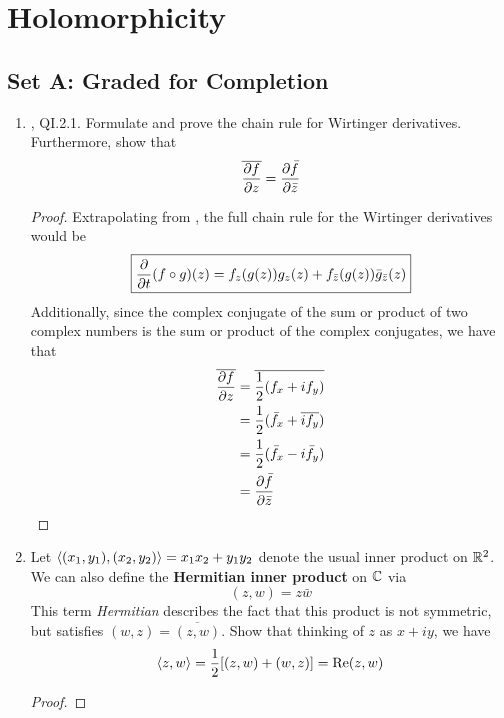 \documentclass[../psets.tex]{subfiles}
\begin{document}
\section{Holomorphicity}
\subsection*{Set A: Graded for Completion}
\begin{enumerate}[ref={A.\arabic*}]
    \item {}\textcite{bib:FischerLieb}, QI.2.1. Formulate and prove the chain rule for Wirtinger derivatives. Furthermore, show that
    \begin{equation*}
        \overline{\pdv{f}{z}} = \pdv{\bar{f}}{\bar{z}}
    \end{equation*}
    \begin{proof}

        Extrapolating from \textcite[11]{bib:FischerLieb}, the full chain rule for the Wirtinger derivatives would be
        \begin{equation*}
            \boxed{\pdv{t}(f\circ g)(z) = f_z(g(z))g_z(z)+f_{\bar{z}}(g(z))\bar{g}_{\bar{z}}(z)}
        \end{equation*}
        Additionally, since the complex conjugate of the sum or product of two complex numbers is the sum or product of the complex conjugates, we have that
        \begin{align*}
            \overline{\pdv{f}{z}} &= \overline{\frac{1}{2}(f_x+if_y)}\\
            &= \frac{1}{2}(\bar{f}_x+\overline{if_y})\\
            &= \frac{1}{2}(\bar{f}_x-i\bar{f}_y)\\
            &= \pdv{\bar{f}}{\bar{z}}
        \end{align*}
    \end{proof}
    \item Let $\left\langle{(x_1,y_1),(x_2,y_2)}\right\rangle=x_1x_2+y_1y_2$ denote the usual inner product on $\mathbb{R}^2$. We can also define the \textbf{Hermitian inner product} on $\mathbb{C}$ via
    \begin{equation*}
        (z,w) = z\bar{w}
    \end{equation*}
    This term \emph{Hermitian} describes the fact that this product is not symmetric, but satisfies $(w,z)=\overline{(z,w)}$. Show that thinking of $z$ as $x+iy$, we have
    \begin{equation*}
        \left\langle{z,w}\right\rangle = \frac{1}{2}[(z,w)+(w,z)] = \operatorname{Re}(z,w)
    \end{equation*}
    \begin{proof}


\end{proof}
\end{enumerate}
\end{document}
